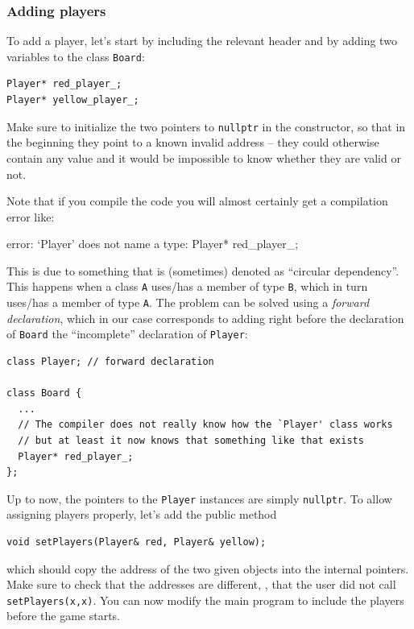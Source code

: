 \documentclass{article}
\begin{document}
\subsubsection{Adding players}

To add a player, let's start by including the relevant header and by adding two variables to the class \texttt{Board}:
\begin{center}
\begin{minipage}{.9\textwidth}
\begin{lstlisting}[style=mycpp,numbers=none]
Player* red_player_;
Player* yellow_player_;
\end{lstlisting}
\end{minipage}
\end{center}
Make sure to initialize the two pointers to \texttt{nullptr} in the constructor, so that in the beginning they point to a known invalid address -- they could otherwise contain any value and it would be impossible to know whether they are valid or not.

Note that if you compile the code you will almost certainly get a compilation error like:
\begin{center}
  \ttfamily
  error: `Player' does not name a type: Player* red\string_player\string_;
\end{center}
This is due to something that is (sometimes) denoted as ``circular dependency''. This happens when a class \texttt{A} uses/has a member of type \texttt{B}, which in turn uses/has a member of type \texttt{A}. The problem can be solved using a \emph{forward declaration}, which in our case corresponds to adding right before the declaration of \texttt{Board} the ``incomplete'' declaration of \texttt{Player}:
\begin{center}
\begin{minipage}{.9\textwidth}
\begin{lstlisting}[style=mycpp,numbers=none]
class Player; // forward declaration

class Board {
  ...
  // The compiler does not really know how the `Player' class works
  // but at least it now knows that something like that exists
  Player* red_player_;
};
\end{lstlisting}
\end{minipage}
\end{center}

Up to now, the pointers to the \texttt{Player} instances are simply \texttt{nullptr}. To allow assigning players properly, let's add the public method
\begin{center}
\begin{minipage}{.9\textwidth}
\begin{lstlisting}[style=mycpp,numbers=none]
void setPlayers(Player& red, Player& yellow);
\end{lstlisting}
\end{minipage}
\end{center}
which should copy the address of the two given objects into the internal pointers. Make sure to check that the addresses are different, \ie, that the user did not call \texttt{setPlayers(x,x)}. You can now modify the main program to include the players before the game starts.
\end{document}
